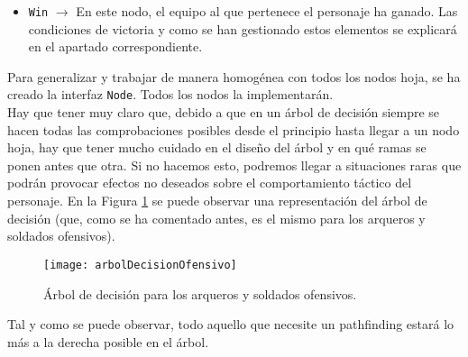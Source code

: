 \begin{itemize}
	\item \texttt{Win} $\rightarrow$ En este nodo, el equipo al que pertenece el personaje ha ganado. Las condiciones de victoria y como se han gestionado estos elementos se explicará en el apartado correspondiente.
\end{itemize}

Para generalizar y trabajar de manera homogénea con todos los nodos hoja, se ha creado la interfaz \texttt{Node}. Todos los nodos la implementarán. \\

Hay que tener muy claro que, debido a que en un árbol de decisión siempre se hacen todas las comprobaciones posibles desde el principio hasta llegar a un nodo hoja, hay que tener mucho cuidado en el diseño del árbol y en qué ramas se ponen antes que otra. Si no hacemos esto, podremos llegar a situaciones raras que podrán provocar efectos no deseados sobre el comportamiento táctico del personaje. En la Figura \ref{ofensivos:ofensivos} se puede observar una representación del árbol de decisión (que, como se ha comentado antes, es el mismo para los arqueros y soldados ofensivos). \\

\begin{figure}[!th]
\texttt{[image: arbolDecisionOfensivo]}
\centering
\caption{Árbol de decisión para los arqueros y soldados ofensivos.}
\label{ofensivos:ofensivos}
\end{figure}

Tal y como se puede observar, todo aquello que necesite un pathfinding estará lo más a la derecha posible en el árbol.
